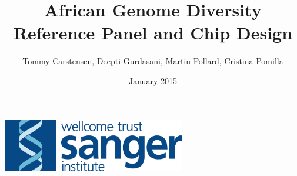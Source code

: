 \documentclass{article}
\title{African Genome Diversity Reference Panel and Chip Design}
\author{Tommy Carstensen, Deepti Gurdasani, Martin Pollard, Cristina Pomilla}
\date{January 2015}
\begin{document}
\maketitle
\centerline{\includegraphics[width=80mm]{sang_logo_large}}




%
%









\end{document}
